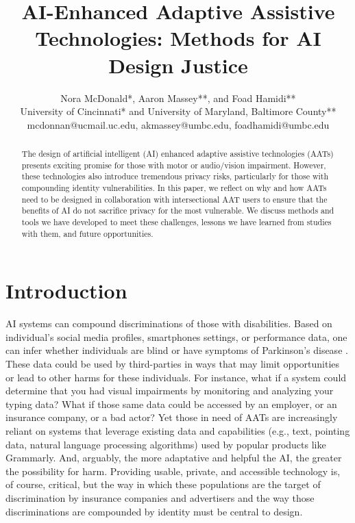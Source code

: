 \documentclass[11pt,dvipdfm]{article}
\begin{document}
\title{AI-Enhanced Adaptive Assistive Technologies: Methods for AI Design Justice}
\author{Nora McDonald*, Aaron Massey**, and Foad Hamidi**\\ 
University of Cincinnati* and University of Maryland, Baltimore County**\\ 
mcdonnan@ucmail.uc.edu, akmassey@umbc.edu, foadhamidi@umbc.edu}


\maketitle
\begin{abstract}
The design of artificial intelligent (AI) enhanced adaptive assistive technologies (AATs) presents exciting promise for those with motor or audio/vision impairment. However, these technologies also introduce tremendous privacy risks, particularly for those with compounding identity vulnerabilities. In this paper, we reflect on why and how AATs need to be designed in collaboration with intersectional AAT users to ensure that the benefits of AI do not sacrifice privacy for the most vulnerable. We discuss methods and tools we have developed to meet these challenges, lessons we have learned from studies with them, and future opportunities.
\end{abstract}

\section{Introduction}
AI systems can compound discriminations of those with disabilities. Based on individual’s social media profiles, smartphones settings, or performance data, one can infer whether individuals are blind \cite{40} or have symptoms of Parkinson’s disease \cite{45}. These data could be used by third-parties in ways that may limit opportunities or lead to other harms for these individuals. For instance, what if a system could determine that you had visual impairments by monitoring and analyzing your typing data? What if those same data could be accessed by an employer, or an insurance company, or a bad actor? Yet those in need of AATs are increasingly reliant on systems that leverage existing data and capabilities (e.g., text, pointing data, natural language processing algorithms) used by popular products like Grammarly. And, arguably, the more adaptative and helpful the AI, the greater the possibility for harm. Providing usable, private, and accessible technology is, of course, critical, but the way in which these populations are the target of discrimination by insurance companies and advertisers and the way those discriminations are compounded by identity must be central to design.
\end{document}
